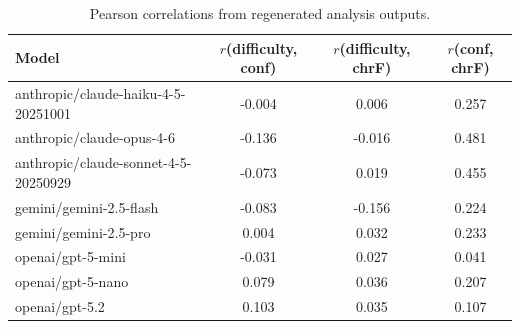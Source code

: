 \begin{table}[t]
\centering
\small
\begin{tabular}{lccc}
\toprule
Model & $r$(difficulty, conf) & $r$(difficulty, chrF) & $r$(conf, chrF) \\
\midrule
anthropic/claude-haiku-4-5-20251001 & -0.004 & 0.006 & 0.257 \\
anthropic/claude-opus-4-6 & -0.136 & -0.016 & 0.481 \\
anthropic/claude-sonnet-4-5-20250929 & -0.073 & 0.019 & 0.455 \\
gemini/gemini-2.5-flash & -0.083 & -0.156 & 0.224 \\
gemini/gemini-2.5-pro & 0.004 & 0.032 & 0.233 \\
openai/gpt-5-mini & -0.031 & 0.027 & 0.041 \\
openai/gpt-5-nano & 0.079 & 0.036 & 0.207 \\
openai/gpt-5.2 & 0.103 & 0.035 & 0.107 \\
\bottomrule
\end{tabular}
\caption{Pearson correlations from regenerated analysis outputs.}
\label{tab:corr}
\end{table}
